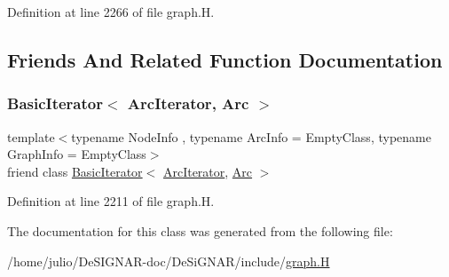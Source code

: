 Definition at line 2266 of file graph.\+H.



\subsection{Friends And Related Function Documentation}
\mbox{\label{class_designar_1_1_digraph_1_1_arc_iterator_a530ad7c7218fa9b74a5cce004d0e3a1c}} 
\subsubsection{\texorpdfstring{Basic\+Iterator$<$ Arc\+Iterator, Arc $>$}{BasicIterator< ArcIterator, Arc >}}
{\footnotesize\ttfamily template$<$typename Node\+Info , typename Arc\+Info  = Empty\+Class, typename Graph\+Info  = Empty\+Class$>$ \\
friend class \hyperlink{class_designar_1_1_basic_iterator}{Basic\+Iterator}$<$ \hyperlink{class_designar_1_1_digraph_1_1_arc_iterator}{Arc\+Iterator}, \hyperlink{class_designar_1_1_digraph_a0ceb278671f2a535c00fddccdeafd69f}{Arc} $>$\hspace{0.3cm}{\ttfamily [friend]}}



Definition at line 2211 of file graph.\+H.



The documentation for this class was generated from the following file\+:\begin{DoxyCompactItemize}
\item 
/home/julio/\+De\+S\+I\+G\+N\+A\+R-\/doc/\+De\+Si\+G\+N\+A\+R/include/\hyperlink{graph_8_h}{graph.\+H}\end{DoxyCompactItemize}
